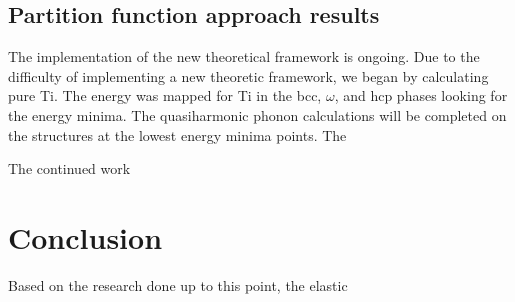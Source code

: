 \subsection{Partition function approach results}

The implementation of the new theoretical framework is ongoing. Due to the difficulty of implementing a new theoretic framework, we began by calculating pure Ti. The energy was mapped for Ti in the bcc, $\omega$, and hcp phases looking for the energy minima. The quasiharmonic phonon calculations will be completed on the structures at the lowest energy minima points. The 

The continued work 

\section{Conclusion}

Based on the research done up to this point, the elastic 

